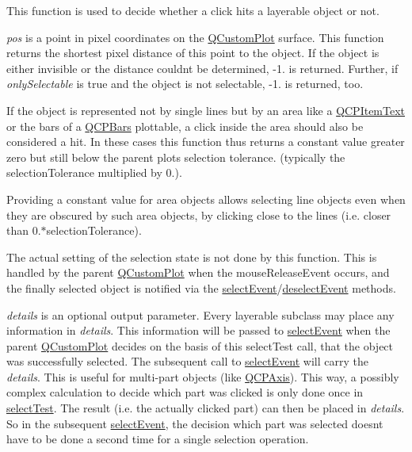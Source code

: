 This function is used to decide whether a click hits a layerable object or not.

{\itshape pos} is a point in pixel coordinates on the \hyperlink{class_q_custom_plot}{Q\+Custom\+Plot} surface. This function returns the shortest pixel distance of this point to the object. If the object is either invisible or the distance couldn\textquotesingle{}t be determined, -\/1. is returned. Further, if {\itshape only\+Selectable} is true and the object is not selectable, -\/1. is returned, too.

If the object is represented not by single lines but by an area like a \hyperlink{class_q_c_p_item_text}{Q\+C\+P\+Item\+Text} or the bars of a \hyperlink{class_q_c_p_bars}{Q\+C\+P\+Bars} plottable, a click inside the area should also be considered a hit. In these cases this function thus returns a constant value greater zero but still below the parent plot\textquotesingle{}s selection tolerance. (typically the selection\+Tolerance multiplied by 0.).

Providing a constant value for area objects allows selecting line objects even when they are obscured by such area objects, by clicking close to the lines (i.\+e. closer than 0.$\ast$selection\+Tolerance).

The actual setting of the selection state is not done by this function. This is handled by the parent \hyperlink{class_q_custom_plot}{Q\+Custom\+Plot} when the mouse\+Release\+Event occurs, and the finally selected object is notified via the \hyperlink{class_q_c_p_layerable_a7498c2d0d081cf7cad0fb3bb93aa0e91}{select\+Event}/\hyperlink{class_q_c_p_layerable_ae546370644a5551c76af739afc008bee}{deselect\+Event} methods.

{\itshape details} is an optional output parameter. Every layerable subclass may place any information in {\itshape details}. This information will be passed to \hyperlink{class_q_c_p_layerable_a7498c2d0d081cf7cad0fb3bb93aa0e91}{select\+Event} when the parent \hyperlink{class_q_custom_plot}{Q\+Custom\+Plot} decides on the basis of this select\+Test call, that the object was successfully selected. The subsequent call to \hyperlink{class_q_c_p_layerable_a7498c2d0d081cf7cad0fb3bb93aa0e91}{select\+Event} will carry the {\itshape details}. This is useful for multi-\/part objects (like \hyperlink{class_q_c_p_axis}{Q\+C\+P\+Axis}). This way, a possibly complex calculation to decide which part was clicked is only done once in \hyperlink{class_q_c_p_layerable_a04db8351fefd44cfdb77958e75c6288e}{select\+Test}. The result (i.\+e. the actually clicked part) can then be placed in {\itshape details}. So in the subsequent \hyperlink{class_q_c_p_layerable_a7498c2d0d081cf7cad0fb3bb93aa0e91}{select\+Event}, the decision which part was selected doesn\textquotesingle{}t have to be done a second time for a single selection operation.

